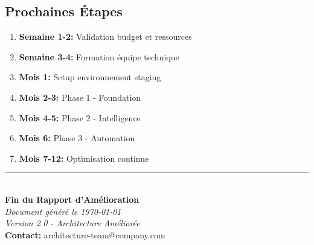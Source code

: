 \documentclass[12pt,a4paper]{article}
\begin{document}
\subsection{Prochaines Étapes}

\begin{enumerate}[leftmargin=2cm]
    \item \textbf{Semaine 1-2:} Validation budget et ressources
    \item \textbf{Semaine 3-4:} Formation équipe technique
    \item \textbf{Mois 1:} Setup environnement staging
    \item \textbf{Mois 2-3:} Phase 1 - Foundation
    \item \textbf{Mois 4-5:} Phase 2 - Intelligence
    \item \textbf{Mois 6:} Phase 3 - Automation
    \item \textbf{Mois 7-12:} Optimisation continue
\end{enumerate}

\vspace{1cm}

\begin{center}
\rule{0.8\textwidth}{0.4pt}\\[0.3cm]
{\large\textbf{Fin du Rapport d'Amélioration}}\\[0.2cm]
\textit{Document généré le \today}\\
\textit{Version 2.0 - Architecture Améliorée}\\[0.3cm]
\textbf{Contact:} architecture-team@company.com
\end{center}
\end{document}
